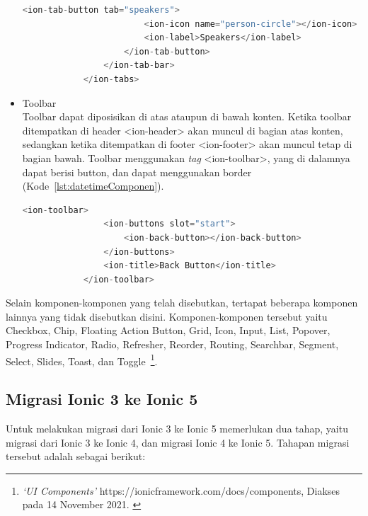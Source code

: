 \begin{itemize}
\begin{lstlisting}[language=php, label={lst:tabsComponent}, caption=Kode Program dari Tabs]
					<ion-tab-button tab="speakers">
						<ion-icon name="person-circle"></ion-icon>
						<ion-label>Speakers</ion-label>
					</ion-tab-button>
				</ion-tab-bar>
			</ion-tabs>
		\end{lstlisting}

\newpage

	\item Toolbar \\
	Toolbar dapat diposisikan di atas ataupun di bawah konten. Ketika toolbar ditempatkan di header <ion-header> akan muncul di bagian atas konten, sedangkan ketika ditempatkan di footer <ion-footer> akan muncul tetap di bagian bawah. Toolbar menggunakan {\it tag} <ion-toolbar>, yang di dalamnya dapat berisi button, dan dapat menggunakan border (Kode~\ref{lst:datetimeComponen}).
		\begin{lstlisting}[language=php, label={lst:datetimeComponent}, caption=Kode Program dari Toolbar dengan Button di Dalamnya]
			<ion-toolbar>
				<ion-buttons slot="start">
					<ion-back-button></ion-back-button>
				</ion-buttons>
				<ion-title>Back Button</ion-title>
			</ion-toolbar>
		\end{lstlisting} 
\end{itemize}
	Selain komponen-komponen yang telah disebutkan, tertapat beberapa komponen lainnya yang tidak disebutkan disini. Komponen-komponen tersebut yaitu Checkbox, Chip, Floating Action Button, Grid, Icon, Input, List, Popover, Progress Indicator, Radio, Refresher, Reorder, Routing, Searchbar, Segment, Select, Slides, Toast, dan Toggle~\footnote{\textit{`UI Components'} https://ionicframework.com/docs/components, Diakses pada 14 November 2021. \label{ref:uiComponents}}.

\subsection{Migrasi Ionic 3 ke Ionic 5}
\label{subsec:migrasi}

Untuk melakukan migrasi dari Ionic 3 ke Ionic 5 memerlukan dua tahap, yaitu migrasi dari Ionic 3 ke Ionic 4, dan migrasi Ionic 4 ke Ionic 5. Tahapan migrasi tersebut adalah sebagai berikut:

